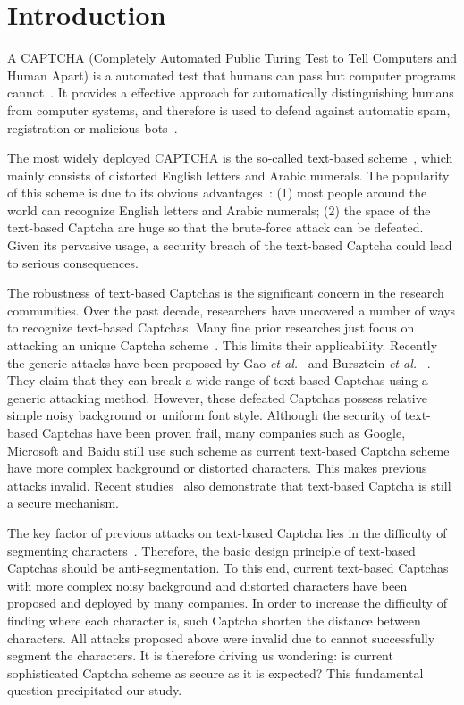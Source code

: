 \section{Introduction}

A CAPTCHA (Completely Automated Public Turing Test to Tell Computers and Human Apart) is a automated test that humans can pass but computer programs cannot~\cite{Von2004Telling}. It provides a effective approach for automatically distinguishing humans from computer systems, and therefore is used to defend against automatic spam, registration or malicious bots~\cite{Von2003CAPTCHA,Tam2008Breaking}.

The most widely deployed CAPTCHA is the so-called text-based scheme~\cite{Yan2008Usability}, which mainly consists of distorted English letters and Arabic numerals. The popularity of this scheme is due to its obvious advantages~\cite{Chellapilla2005Building,Chellapilla2005Computers}: (1) most people around the world can recognize English letters and Arabic numerals; (2) the space of the text-based Captcha are huge so that the brute-force attack can be defeated. Given its pervasive usage, a security breach of the text-based Captcha could lead to serious consequences.

The robustness of text-based Captchas is the significant concern in the research communities. Over the past decade, researchers have uncovered a number of ways to recognize text-based Captchas. Many fine prior researches just focus on attacking an unique Captcha scheme~\cite{Gao2013The,Gao2017Research,Mohamed2014A,Yan2008A}. This limits their applicability. Recently the generic attacks have been proposed by Gao \emph{et al.}~\cite{Gao2016A} and Bursztein \emph{et al.} ~\cite{Bursztein2011Text,Bursztein2014The}. They claim that they can break a wide range of text-based Captchas using a generic attacking method. However, these defeated Captchas possess relative simple noisy background or uniform font style. Although the security of text-based Captchas have been proven frail, many companies such as Google, Microsoft and Baidu still use such scheme as current text-based Captcha scheme have more complex background or distorted characters. This makes previous attacks invalid.  Recent studies~\cite{Thomas2013Trafficking,Bursztein2014Easy} also demonstrate that text-based Captcha is still a secure mechanism.

The key factor of previous attacks on text-based Captcha lies in the difficulty of segmenting characters~\cite{Chellapilla2005Computers}. Therefore, the basic design principle of text-based Captchas should be anti-segmentation. To this end, current text-based Captchas with more complex noisy background and distorted characters have been proposed and deployed by many companies. In order to increase the difficulty of finding where each character is, such Captcha shorten the distance between characters. All attacks proposed above were invalid due to cannot successfully segment the characters. It is therefore driving us wondering: is current sophisticated Captcha scheme as secure as it is expected? This fundamental question precipitated our study.


